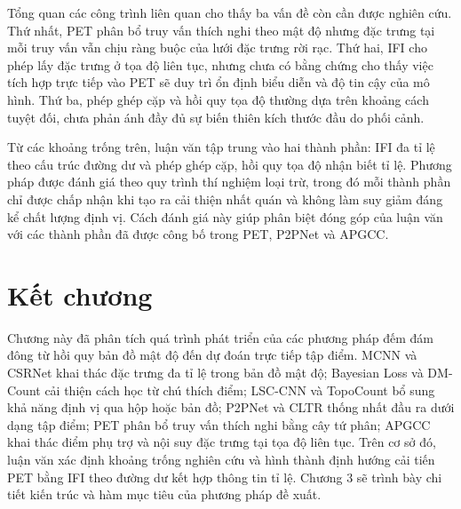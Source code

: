 Tổng quan các công trình liên quan cho thấy ba vấn đề còn cần được nghiên cứu. Thứ nhất, PET phân bổ truy vấn thích nghi theo mật độ nhưng đặc trưng tại mỗi truy vấn vẫn chịu ràng buộc của lưới đặc trưng rời rạc. Thứ hai, IFI cho phép lấy đặc trưng ở tọa độ liên tục, nhưng chưa có bằng chứng cho thấy việc tích hợp trực tiếp vào PET sẽ duy trì ổn định biểu diễn và độ tin cậy của mô hình. Thứ ba, phép ghép cặp và hồi quy tọa độ thường dựa trên khoảng cách tuyệt đối, chưa phản ánh đầy đủ sự biến thiên kích thước đầu do phối cảnh.

Từ các khoảng trống trên, luận văn tập trung vào hai thành phần: IFI đa tỉ lệ theo cấu trúc đường dư và phép ghép cặp, hồi quy tọa độ nhận biết tỉ lệ. Phương pháp được đánh giá theo quy trình thí nghiệm loại trừ, trong đó mỗi thành phần chỉ được chấp nhận khi tạo ra cải thiện nhất quán và không làm suy giảm đáng kể chất lượng định vị. Cách đánh giá này giúp phân biệt đóng góp của luận văn với các thành phần đã được công bố trong PET, P2PNet và APGCC.

\section{Kết chương}

Chương này đã phân tích quá trình phát triển của các phương pháp đếm đám đông từ hồi quy bản đồ mật độ đến dự đoán trực tiếp tập điểm. MCNN và CSRNet khai thác đặc trưng đa tỉ lệ trong bản đồ mật độ; Bayesian Loss và DM-Count cải thiện cách học từ chú thích điểm; LSC-CNN và TopoCount bổ sung khả năng định vị qua hộp hoặc bản đồ; P2PNet và CLTR thống nhất đầu ra dưới dạng tập điểm; PET phân bổ truy vấn thích nghi bằng cây tứ phân; APGCC khai thác điểm phụ trợ và nội suy đặc trưng tại tọa độ liên tục. Trên cơ sở đó, luận văn xác định khoảng trống nghiên cứu và hình thành định hướng cải tiến PET bằng IFI theo đường dư kết hợp thông tin tỉ lệ. Chương 3 sẽ trình bày chi tiết kiến trúc và hàm mục tiêu của phương pháp đề xuất.
